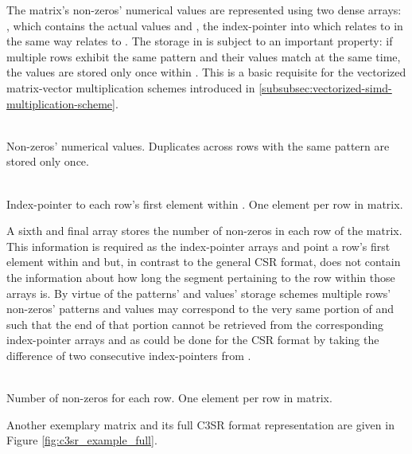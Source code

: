 \documentclass{article}
\begin{document}
    The matrix's non-zeros' numerical values are represented using two dense arrays: \V, which contains the actual values and \VS, the index-pointer into \V which relates to \V in the same way \JS relates to \J. The storage in \V is subject to an important property: if multiple rows exhibit the same pattern and their values match at the same time, the values are stored only once within \V. This is a basic requisite for the vectorized matrix-vector multiplication schemes introduced in \ref{subsubsec:vectorized-simd-multiplication-scheme}.

    \begin{description}[align = left, labelwidth = 4cm]
      \item [\V - \emph{Values}] \hfill \\
        Non-zeros' numerical values. Duplicates across rows with the same pattern are stored only once.
      \item [\VS - \emph{Values' index-pointers}] \hfill \\
        Index-pointer to each row's first element within \V. One element per row in matrix.
    \end{description}

    A sixth and final array \RS stores the number of non-zeros in each row of the matrix. This information is required as the index-pointer arrays \JS and \VS point a row's first element within \J and \V but, in contrast to the general CSR format, does not contain the information about how long the segment pertaining to the row within those arrays is. By virtue of the patterns' and values' storage schemes multiple rows' non-zeros' patterns and values may correspond to the very same portion of \J and \V such that the end of that portion cannot be retrieved from the corresponding index-pointer arrays \JS and \VS as could be done for the CSR format by taking the difference of two consecutive index-pointers from \RP.

    \begin{description}[align = left, labelwidth = 4cm]
      \item [\RS - \emph{Row sizes}] \hfill \\
        Number of non-zeros for each row. One element per row in matrix.
    \end{description}

    Another exemplary matrix and its full C3SR format representation are given in Figure \ref{fig:c3sr_example_full}.
\end{document}
